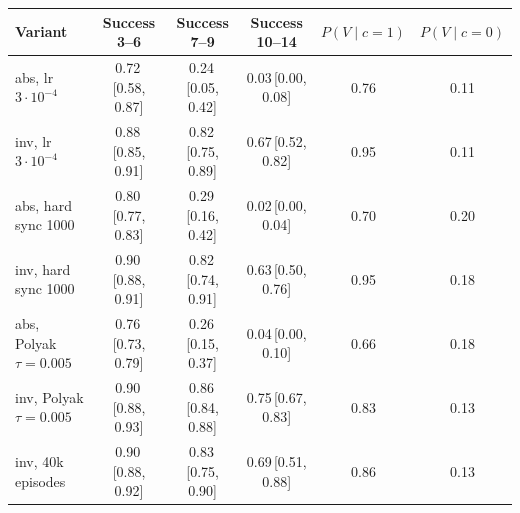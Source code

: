 \begin{tabular}{lccccc}
\toprule
Variant & Success 3--6 & Success 7--9 & Success 10--14 & $P(V\mid c{=}1)$ & $P(V\mid c{=}0)$ \\
\midrule
abs, lr $3{\cdot}10^{-4}$ & 0.72\,{\scriptsize[0.58, 0.87]} & 0.24\,{\scriptsize[0.05, 0.42]} & 0.03\,{\scriptsize[0.00, 0.08]} & 0.76 & 0.11 \\
inv, lr $3{\cdot}10^{-4}$ & 0.88\,{\scriptsize[0.85, 0.91]} & 0.82\,{\scriptsize[0.75, 0.89]} & 0.67\,{\scriptsize[0.52, 0.82]} & 0.95 & 0.11 \\
abs, hard sync 1000 & 0.80\,{\scriptsize[0.77, 0.83]} & 0.29\,{\scriptsize[0.16, 0.42]} & 0.02\,{\scriptsize[0.00, 0.04]} & 0.70 & 0.20 \\
inv, hard sync 1000 & 0.90\,{\scriptsize[0.88, 0.91]} & 0.82\,{\scriptsize[0.74, 0.91]} & 0.63\,{\scriptsize[0.50, 0.76]} & 0.95 & 0.18 \\
abs, Polyak $\tau{=}0.005$ & 0.76\,{\scriptsize[0.73, 0.79]} & 0.26\,{\scriptsize[0.15, 0.37]} & 0.04\,{\scriptsize[0.00, 0.10]} & 0.66 & 0.18 \\
inv, Polyak $\tau{=}0.005$ & 0.90\,{\scriptsize[0.88, 0.93]} & 0.86\,{\scriptsize[0.84, 0.88]} & 0.75\,{\scriptsize[0.67, 0.83]} & 0.83 & 0.13 \\
inv, 40k episodes & 0.90\,{\scriptsize[0.88, 0.92]} & 0.83\,{\scriptsize[0.75, 0.90]} & 0.69\,{\scriptsize[0.51, 0.88]} & 0.86 & 0.13 \\
\bottomrule
\end{tabular}
